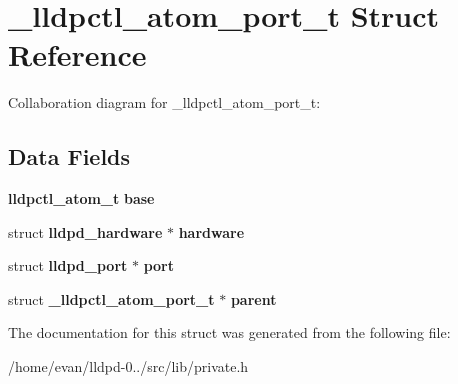 \section{\-\_\-lldpctl\-\_\-atom\-\_\-port\-\_\-t \-Struct \-Reference}
\label{struct__lldpctl__atom__port__t}


\-Collaboration diagram for \-\_\-lldpctl\-\_\-atom\-\_\-port\-\_\-t\-:
\subsection*{\-Data \-Fields}
\begin{DoxyCompactItemize}
\item 
{\bf lldpctl\-\_\-atom\-\_\-t} {\bfseries base}\label{struct__lldpctl__atom__port__t_add397d02e5d3c1626944dc981febfa0f}

\item 
struct {\bf lldpd\-\_\-hardware} $\ast$ {\bfseries hardware}\label{struct__lldpctl__atom__port__t_ad8c7625978cf52500835f92828fed5fd}

\item 
struct {\bf lldpd\-\_\-port} $\ast$ {\bfseries port}\label{struct__lldpctl__atom__port__t_a8c510492b0e06d8e2ec6b4d94ac20e65}

\item 
struct {\bf \-\_\-lldpctl\-\_\-atom\-\_\-port\-\_\-t} $\ast$ {\bfseries parent}\label{struct__lldpctl__atom__port__t_a6b11064aa792e72fda7db80104928434}

\end{DoxyCompactItemize}


\-The documentation for this struct was generated from the following file\-:\begin{DoxyCompactItemize}
\item 
/home/evan/lldpd-\/0../src/lib/private.\-h\end{DoxyCompactItemize}
